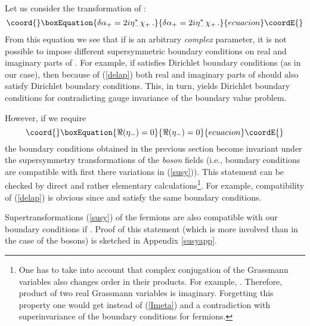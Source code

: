 \documentclass[a4paper,12pt]{article}
\begin{document}
Let us consider the \myHighlight{$\eta_-$}\coordHE{} transformation of \myHighlight{$\alpha_+$}\coordHE{}:
\begin{equation}\coord{}\boxEquation{
\delta \alpha_+ =2i\eta_-^* \chi_+ \,.\label{delap}
}{
\delta \alpha_+ =2i\eta_-^* \chi_+ \,.}{ecuacion}\coordE{}\end{equation}
From this equation we see that if \myHighlight{$\eta_-$}\coordHE{} is an arbitrary
{\it complex} parameter, it is not possible to impose 
different supersymmetric boundary conditions on real
and imaginary parts of \myHighlight{$\alpha_+$}\coordHE{}. For example, if 
\coordHE{} satisfies
Dirichlet boundary conditions (as in our case), then
because of (\ref{delap})
both real and imaginary parts of \myHighlight{$\chi_+$}\coordHE{} should also
satisfy Dirichlet boundary conditions. This, in turn,
yields Dirichlet boundary conditions for
\coordHE{} contradicting gauge
invariance of the boundary value problem.

However, if we require
\begin{equation}\coord{}\boxEquation{
\Re (\eta_-) =0 \label{Imeta}
}{
\Re (\eta_-) =0 }{ecuacion}\coordE{}\end{equation}
the boundary conditions obtained in the previous section
become invariant under the supersymmetry transformations
of the {\it boson} fields (i.e., boundary conditions are
compatible with first there variations in (\ref{susy})).
This statement can be checked by direct and rather elementary
calculations\footnote{One has to take into account that complex
conjugation of the Grassmann variables also changes order in their
products. For example, \myHighlight{$(\eta^*_-\chi_-)^*=\chi_-^*\eta_-$}\coordHE{}.
Therefore, product of two real Grassmann variables is imaginary.
Forgetting this property one would get \coordHE{} instead
of (\ref{Imeta}) and a contradiction with superinvariance of the boundary
conditions for fermions.}. For example, compatibility of (\ref{delap})
is obvious since \myHighlight{$\alpha_+$}\coordHE{} and \coordHE{} satisfy the same
boundary conditions. 

Supertransformations (\ref{susy}) of the fermions are also compatible
with our boundary conditions if \coordHE{}.
Proof of this statement (which is more involved than in the case of the bosons)
is sketched in Appendix \ref{susyapp}. 
\end{document}
